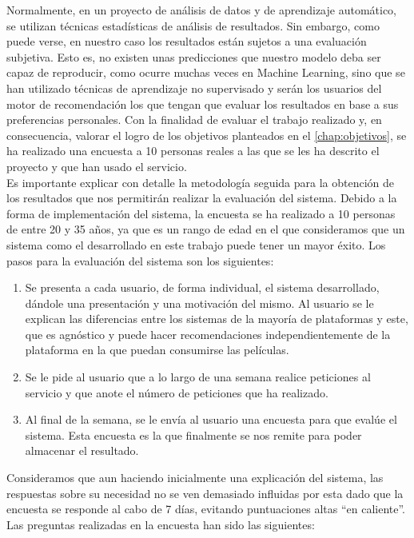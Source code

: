 Normalmente, en un proyecto de análisis de datos y de aprendizaje automático, se utilizan técnicas estadísticas de análisis de resultados. Sin embargo, como puede verse, en nuestro caso los resultados están sujetos a una evaluación subjetiva. Esto es, no existen unas predicciones que nuestro modelo deba ser capaz de reproducir, como ocurre muchas veces en Machine Learning, sino que se han utilizado técnicas de aprendizaje no supervisado y serán los usuarios del motor de recomendación los que tengan que evaluar los resultados en base a sus preferencias personales. Con la finalidad de evaluar el trabajo realizado y, en consecuencia, valorar el logro de los objetivos planteados en el \autoref{chap:objetivos}, se ha realizado una encuesta a 10 personas reales a las que se les ha descrito el proyecto y que han usado el servicio.\\

Es importante explicar con detalle la metodología seguida para la obtención de los resultados que nos permitirán realizar la evaluación del sistema. Debido a la forma de implementación del sistema, la encuesta se ha realizado a 10 personas de entre 20 y 35 años, ya que es un rango de edad en el que consideramos que un sistema como el desarrollado en este trabajo puede tener un mayor éxito. Los pasos para la evaluación del sistema son los siguientes:

\begin{enumerate}
    \item Se presenta a cada usuario, de forma individual, el sistema desarrollado, dándole una presentación y una motivación del mismo. Al usuario se le explican las diferencias entre los sistemas de la mayoría de plataformas y este, que es agnóstico y puede hacer recomendaciones independientemente de la plataforma en la que puedan consumirse las películas.
    \item Se le pide al usuario que a lo largo de una semana realice peticiones al servicio y que anote el número de peticiones que ha realizado.
    \item Al final de la semana, se le envía al usuario una encuesta para que evalúe el sistema. Esta encuesta es la que finalmente se nos remite para poder almacenar el resultado.
\end{enumerate}

Consideramos que aun haciendo inicialmente una explicación del sistema, las respuestas sobre su necesidad no se ven demasiado influidas por esta dado que la encuesta se responde al cabo de 7 días, evitando puntuaciones altas ``en caliente''. Las preguntas realizadas en la encuesta han sido las siguientes:

